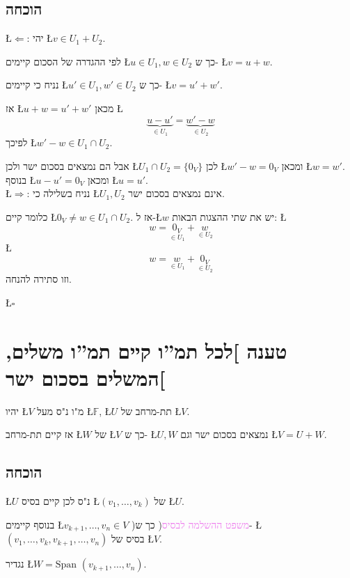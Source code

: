 \documentclass[english,hebrew]{article}
\newcommand{\spn}{\text{Span }}
\begin{document}
\subsection{הוכחה}

\L{$\Leftarrow$}: יהי \L{$v\in U_{1}+U_{2}$}.

לפי ההגדרה של הסכום קיימים \L{$u\in U_{1},w\in U_{2}$} כך ש- \L{$v=u+w$}.

נניח כי קיימים \L{$u'\in U_{1},w'\in U_{2}$} כך ש- \L{$v=u'+w'$}.

אז \L{$u+w=u'+w'$} מכאן \L{%
\[
\underbrace{u-u'}_{\in U_{1}}=\underbrace{w'-w}_{\in U_{2}}
\]
}%
לפיכך \L{$w'-w\in U_{1}\cap U_{2}$}. 

אבל הם נמצאים בסכום ישר ולכן \L{$U_{1}\cap U_{2}=\{0_{V}\}$} לכן
\L{$w'-w=0_{V}$} ומכאן \L{$w=w'$}. בנוסף \L{$u-u'=0_{V}$} ומכאן
\L{$u=u'$}.\\

\L{$\Rightarrow$}: נניח בשלילה כי \L{$U_{1},U_{2}$} אינם נמצאים
בסכום ישר.

כלומר קיים \L{$0_{V}\neq w\in U_{1}\cap U_{2}$}. אז ל-\L{$w$} יש
את שתי ההצגות הבאות: \L{%
\[
w=\underset{\in U_{1}}{0_{V}}+\underset{\in U_{2}}{w}
\]
}%
\L{%
\[
w=\underset{\in U_{1}}{w}+\underset{\in U_{2}}{0_{V}}
\]
}%
וזו סתירה להנחה.
\begin{flushright}
\L{$\square$}
\par\end{flushright}

\section{טענה {]}לכל תמ\textquotedblright ו קיים תמ\textquotedblright ו משלים,
המשלים בסכום ישר{[}}

יהיו \L{$V$} מ"ו נ"ס מעל \L{$\mathbb{F}$}, \L{$U$} תת-מרחב של
\L{$V$}.

אז קיים תת-מרחב \L{$W$} של \L{$V$} כך ש- \L{$U,W$} נמצאים בסכום
ישר וגם \L{$V=U+W$}.

\subsection{הוכחה}

\L{$U$} נ"ס לכן קיים בסיס \L{$(v_{1},\dots,v_{k})$} של \L{$U$}.

בנוסף קיימים \L{$v_{k+1},\dots,v_{n}\in V$} )\textcolor{violet}{משפט
ההשלמה לבסיס}( כך ש- \L{$(v_{1},\dots,v_{k},v_{k+1},\dots,v_{n})$}
בסיס של \L{$V$}.

נגדיר \L{$W=\spn(v_{k+1},\dots,v_{n})$}.
\end{document}
